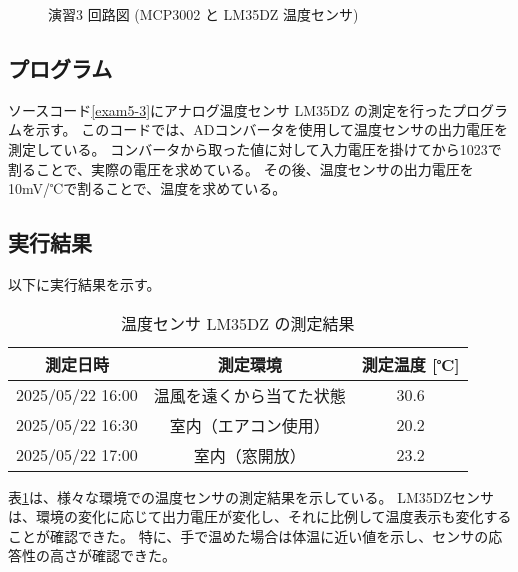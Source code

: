 \documentclass[a4paper,11pt,dvipdfmx]{jsarticle}
\begin{document}
\begin{figure}
\begin{tikzpicture}[scale=0.8, transform shape]

   
    \end{tikzpicture}
    \caption{演習3 回路図 (MCP3002 と LM35DZ 温度センサ)}
    \label{fig:exercise3_updated}
\end{figure}

\subsection{プログラム}
ソースコード\ref{exam5-3}にアナログ温度センサ LM35DZ の測定を行ったプログラムを示す。
このコードでは、ADコンバータを使用して温度センサの出力電圧を測定している。
コンバータから取った値に対して入力電圧を掛けてから1023で割ることで、実際の電圧を求めている。
その後、温度センサの出力電圧を10mV/℃で割ることで、温度を求めている。

\subsection{実行結果}
以下に実行結果を示す。
\begin{table}[htbp]
    \centering
    \caption{温度センサ LM35DZ の測定結果}
    \begin{tabular}{|c|c|c|}
        \hline
        \textbf{測定日時} & \textbf{測定環境} & \textbf{測定温度 [℃]} \\
        \hline
        2025/05/22 16:00 & 温風を遠くから当てた状態 & 30.6 \\
        \hline
        2025/05/22 16:30 & 室内（エアコン使用） & 20.2 \\
        \hline
        2025/05/22 17:00 & 室内（窓開放） & 23.2 \\
        \hline
    \end{tabular}
    \label{tab:temperature_results}
\end{table}

\noindent
表\ref{tab:temperature_results}は、様々な環境での温度センサの測定結果を示している。
LM35DZセンサは、環境の変化に応じて出力電圧が変化し、それに比例して温度表示も変化することが確認できた。
特に、手で温めた場合は体温に近い値を示し、センサの応答性の高さが確認できた。
\end{document}
